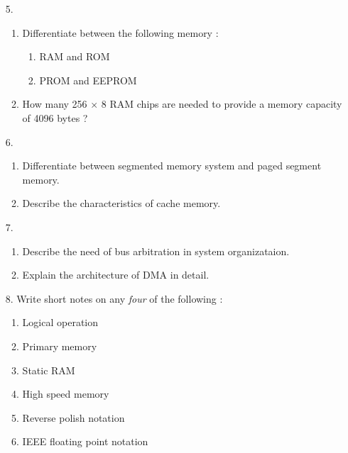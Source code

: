\documentclass[12pt]{article}
\begin{document}
\begin{enumerate}
	\item[5.]
	\begin{enumerate}
		\item Differentiate between the following memory :
			\begin{enumerate}
				\item RAM and ROM
				\item PROM and EEPROM
			\end{enumerate}
		\item How many 256 $\times$ 8 RAM chips are needed to provide a memory capacity of 4096 bytes ?
	\end{enumerate}

	\item[6.]
	\begin{enumerate}
		\item Differentiate between segmented memory system and paged segment memory.
		\item Describe the characteristics of cache memory.
	\end{enumerate}

	\item[7.]
	\begin{enumerate}
		\item Describe the need of bus arbitration in system organizataion.
		\item Explain the architecture of DMA in detail.
	\end{enumerate}

	\item[8.] Write short notes on any \textit{four} of the following :
	\begin{enumerate}
		\item Logical operation
		\item Primary memory
		\item Static RAM
		\item High speed memory
		\item Reverse polish notation
		\item IEEE floating point notation
	\end{enumerate}

\end{enumerate}
\end{document}
